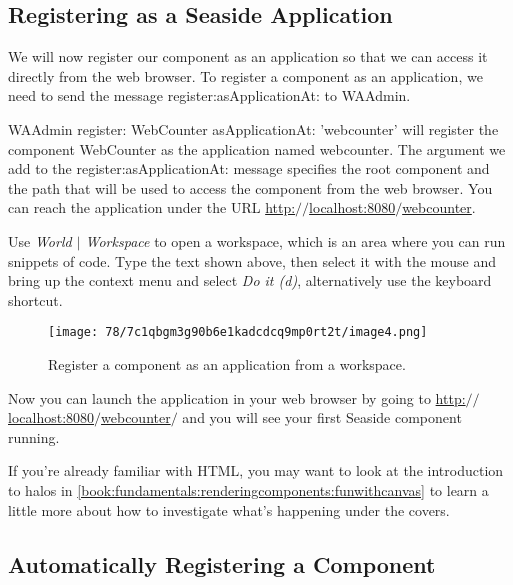 \documentclass[a4paper,10pt,twoside]{book}
\newcommand{\ct}[1]{{\small\ttfamily\textup{#1}}}
\begin{document}
\subsection{Registering as a Seaside  Application}
\label{book:gettingstarted:pharo:firstcomponent:registering}

We will now register our component as an application so that we can access it directly from the web browser. To register a component as an application, we need to send the message \ct{register:asApplicationAt:} to \ct{WAAdmin}.

 \ct{WAAdmin register: WebCounter asApplicationAt: 'webcounter'} will register the component \ct{WebCounter} as the application named \ct{webcounter}. The argument we add to the \ct{register:asApplicationAt:} message specifies the root component and the path that will be used to access the component from the web browser. You can reach the application under the URL \href{http://localhost:8080/webcounter}{http:$/$$/$localhost:8080$/$webcounter}.

Use \textit{World $|$ Workspace} to open a workspace, which is an area where you can run snippets of code. Type the text shown above, then select it with the mouse and bring up the context menu and select \textit{Do it (d)}, alternatively use the keyboard shortcut. 

\begin{figure}[h!tbp]
	\begin{center}
		\texttt{[image: 78/7c1qbgm3g90b6e1kadcdcq9mp0rt2t/image4.png]}
		\caption{Register a component as an application from a workspace.\label{book:gettingstarted:pharo:firstcomponent:registering:workspace}}
	\end{center}
\end{figure}


Now you can launch the application in your web browser by going to \href{http://localhost:8080/webcounter/}{http:$/$$/$localhost:8080$/$webcounter$/$} and you will see your first Seaside component running.

If you're already familiar with HTML, you may want to look at the introduction to halos in \autoref{book:fundamentals:renderingcomponents:funwithcanvas} to learn a little more about how to investigate what's happening under the covers. 

\subsection{Automatically Registering a Component}
\label{book:gettingstarted:pharo:firstcomponent:autoregister}
\end{document}
